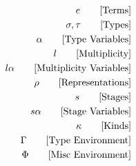 \documentclass {article}
\begin{document}
\Large

\begin{align*}
e \tag* {[Terms]}\\
\sigma, \tau \tag* {[Types]} \\
\alpha \tag* {[Type Variables]} \\
l \tag* {[Multiplicity]} \\
l \alpha \tag* {[Multiplicity Variables]} \\
\rho \tag* {[Representations]} \\
s \tag* {[Stages]} \\
s \alpha \tag* {[Stage Variables]} \\
\kappa \tag* {[Kinds]} \\
\Gamma \tag* {[Type Environment]} \\
\Phi \tag* {[Misc Environment]}
\end{align*}
\end{document}
